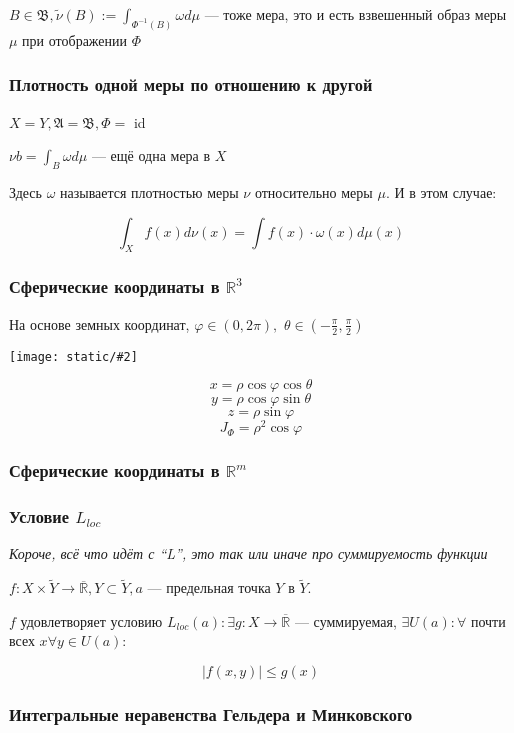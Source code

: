 \documentclass{article}
\def\dbl{\,\,}
\def\images#1#2{\begin{center}\texttt{[image: static/\#2]}\end{center}}
\def\rinf{\overline{\mathbb{R}}}
\begin{document}
$B \in \mathfrak{B}, \tilde{\nu}(B) := \int_{\Phi^{-1}(B)} \omega d\mu$ --- тоже мера, это и есть взвешенный образ меры $\mu$ при отображении $\Phi$

\subsubsection{Плотность одной меры по отношению к другой}

$X = Y, \mathfrak{A} = \mathfrak{B}, \Phi = $ id

$\nu b = \int_{B} \omega d \mu$ --- ещё одна мера в $X$

Здесь $\omega$ называется плотностью меры $\nu$ относительно меры $\mu$. И в этом случае:

\[\int_{X}f(x)d\nu(x) = \int f(x) \cdot \omega(x) d\mu(x)\]

\subsubsection{Сферические координаты в $\mathbb{R}^3$}

На основе земных координат, $\varphi \in (0, 2\pi), \dbl \theta \in \left(-\frac{\pi}{2}, \frac{\pi}{2}\right)$

\images{0.3}{sph_3d.jpg}

\[x = \rho \cos \varphi \cos \theta\]
\[y = \rho \cos \varphi \sin \theta\]
\[z = \rho \sin \varphi\]
\[J_{\Phi} = \rho ^ 2 \cos \varphi\]

\subsubsection{Сферические координаты в $\mathbb{R}^m$}


\subsubsection{Условие $L_{loc}$}

\textit{Короче, всё что идёт с ``L'', это так или иначе про суммируемость функции}

$f: X \times \tilde{Y} \rightarrow \rinf, Y \subset \tilde{Y}, a$ --- предельная точка $Y$ в $\tilde{Y}$. 

$f$ удовлетворяет условию $L_{loc}(a): \exists g: X \rightarrow \rinf$ --- суммируемая, $\exists U(a): \forall$ почти всех $x \forall y \in U(a)$:

\[|f(x, y)| \le g(x)\]

\subsubsection{Интегральные неравенства Гельдера и Минковского}
\end{document}
